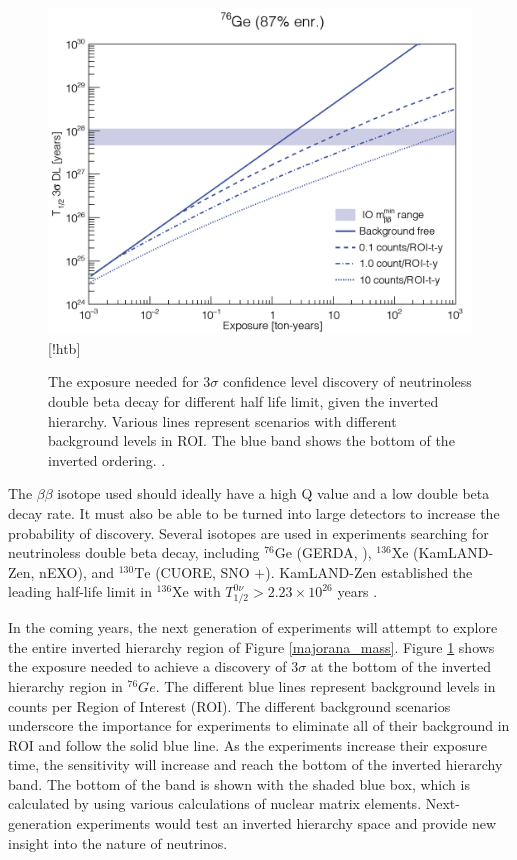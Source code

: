 \begin{figure}[!htb]
\centering
\includegraphics[width=0.8\linewidth]{ch1/figs/exposure_plot.png}[!htb]
\caption{The exposure needed for 3$\sigma$ confidence level discovery of neutrinoless double beta decay for different half life limit, given the inverted hierarchy. Various lines represent scenarios with different background levels in ROI. The blue band shows the bottom of the inverted ordering. \cite{Gruszko:2017kfx}.}
\label{exposure_plot}
\end{figure}

The $\beta\beta$ isotope used should ideally have a high Q value and a low double beta decay rate. It must also be able to be turned into large detectors to increase the probability of discovery. Several isotopes are used in experiments searching for neutrinoless double beta decay, including ${}^{76}\mathrm{Ge}$ (GERDA\cite{GERDA_final}, {\MJD}\cite{Majorana_final}), ${}^{136}\mathrm{Xe}$ (KamLAND-Zen\cite{KamLAND-Zen:2024eml}, nEXO\cite{nEXO:2021ujk}), and ${}^{130}\mathrm{Te}$ (CUORE\cite{Arnaboldi2002du}, SNO $+$\cite{SNO_paper}). KamLAND-Zen established the leading half-life limit in $^{136}$Xe with $T^{0\nu}_{1/2} > 2.23 \times 10^{26}$ years \cite{KamLAND-Zen:2024eml}. 


In the coming years, the next generation of experiments will attempt to explore the entire inverted hierarchy region of Figure \ref{majorana_mass}. Figure \ref{exposure_plot} shows the exposure needed to achieve a discovery of $3\sigma$ at the bottom of the inverted hierarchy region in ${}^{76}Ge$. The different blue lines represent background levels in counts per Region of Interest (ROI). The different background scenarios underscore the importance for experiments to eliminate all of their background in ROI and follow the solid blue line. As the experiments increase their exposure time, the sensitivity will increase and reach the bottom of the inverted hierarchy band. The bottom of the band is shown with the shaded blue box, which is calculated by using various calculations of nuclear matrix elements. Next-generation experiments would test an inverted hierarchy space and provide new insight into the nature of neutrinos.

